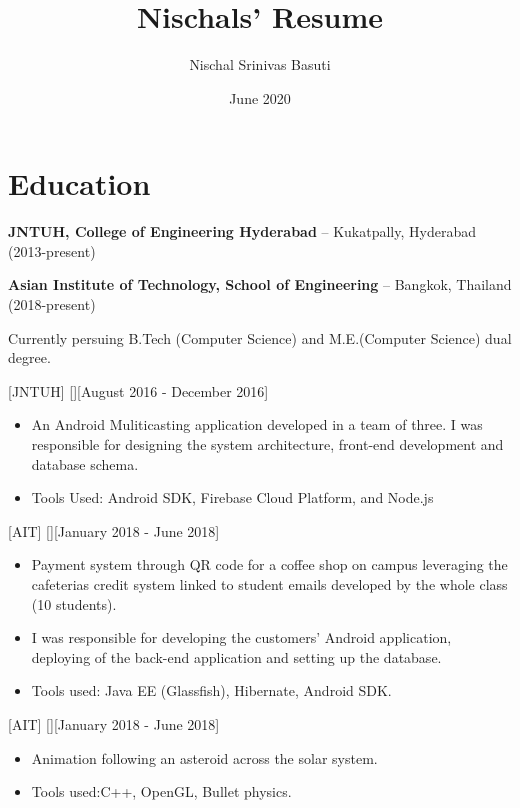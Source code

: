 \documentclass{article}
\title{Nischals' Resume}
\author{Nischal Srinivas Basuti}
\date{June 2020}
\begin{document}

\makecvtitle %

\section{Education}
\textbf{JNTUH, College of Engineering Hyderabad} -- Kukatpally, Hyderabad (2013-present)

\textbf{Asian Institute of Technology, School of Engineering} -- Bangkok, Thailand (2018-present)

Currently persuing B.Tech (Computer Science) and M.E.(Computer Science) dual degree. 

[JNTUH]
[][August 2016 - December 2016]

\begin{itemize}
    \item An Android Muliticasting application developed in a team of three. I was responsible for designing the system architecture, front-end development and database schema.
    \item Tools Used: Android SDK, Firebase Cloud Platform, and Node.js
\end{itemize}
 
[AIT]
[][January 2018 - June 2018]
\begin{itemize}
    \item  Payment system through QR code for a coffee shop on campus leveraging the cafeterias credit system linked to
    student emails developed by the whole class (10 students).
    \item I was responsible for developing the customers' Android application, deploying of the back-end application and
    setting up the database.
    \item Tools used: Java EE (Glassfish), Hibernate, Android SDK.
\end{itemize}

[AIT]
[][January 2018 - June 2018]
\begin{itemize}
    \item Animation following an asteroid across the solar system.
    \item Tools used:C++, OpenGL, Bullet physics.
\end{itemize}
\end{document}
